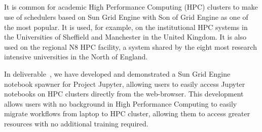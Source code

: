   \subparagraph{}
  
It is common for academic High Performance Computing (HPC) clusters to make
use of schedulers based on Sun Grid Engine with Son of Grid Engine as one of
the most popular. It is used, for example, on the institutional HPC systems
in the Universities of Sheffield and Manchester in the United Kingdom. It is also used
on the regional N8 HPC facility, a system shared by the eight most research
intensive universities in the North of England.

In deliverable~, we have developed and demonstrated a Sun Grid Engine
notebook spawner for Project Jupyter, allowing users to easily access
Jupyter notebooks on HPC clusters directly from the web-browser. This
development allows users with no background in High Performance Computing to
easily migrate workflows from laptop to HPC cluster, allowing them to access
greater resources with no additional training required.
